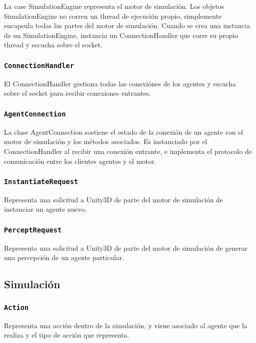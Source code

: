 \documentclass[a4paper,oneside]{article}
\begin{document}
La case SimulationEngine representa el motor de simulación. 
Los objetos SimulationEngine no corren un thread de ejecución propio,
simplemente encapsula todas las partes del motor de simulación. 
Cuando se crea una instancia de un SimulationEngine, 
instancia un ConnectionHandler que corre su propio thread y escucha sobre el
socket. 

\subsubsection{\texttt{ConnectionHandler}}

El ConnectionHandler gestiona todas las conexiónes de los agentes y escucha 
sobre el socket para recibir conexiones entrantes.

\subsubsection{\texttt{AgentConnection}}

La clase AgentConnection sostiene el estado de la conexión de un agente con 
el motor de simulación y los métodos asociados.
Es instanciado por el ConnectionHandler al recibir una conexión entrante, e
implementa el protocolo de comunicación entre los clientes agentes y el motor.

\subsubsection{\texttt{InstantiateRequest}}

Representa una solicitud a Unity3D de parte del motor de simulación de 
instanciar un agente nuevo.

\subsubsection{\texttt{PerceptRequest}}

Representa una solicitud a Unity3D de parte del motor de simulación de generar
una percepción de un agente particular.

\subsection{Simulación}

\subsubsection{\texttt{Action}}

Representa una acción dentro de la simulación, y viene asociado al agente que la
realiza y el tipo de acción que representa.
\end{document}

